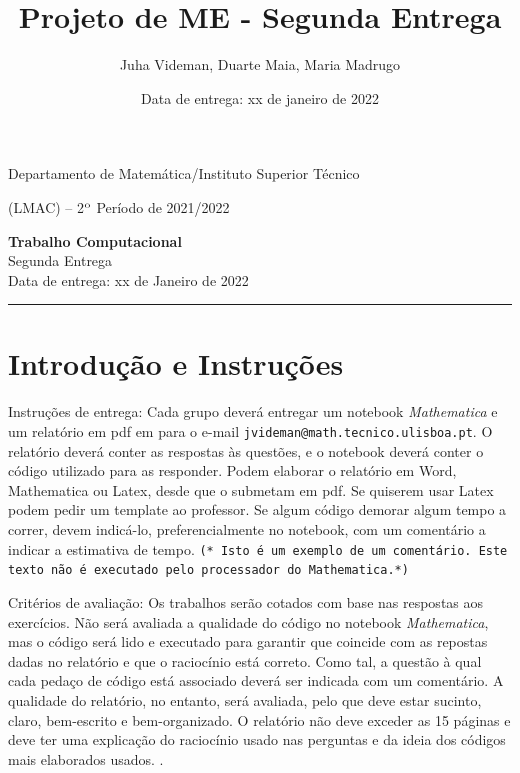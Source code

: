 \documentclass{article}
\title{Projeto de ME - Segunda Entrega}
\author{Juha Videman, Duarte Maia, Maria Madrugo}
\date{Data de entrega: xx de janeiro de 2022}
\begin{document}

\noindent Departamento de  Matemática/Instituto Superior
Técnico \vspace{3mm}

 ({\small LMAC}) -- 2$^{\rm o}$ Período de 2021/2022

\bigskip

\begin{center}
{\bf\Large   Trabalho Computacional}\\ 
\smallskip
{\large Segunda Entrega}\\
Data de entrega: xx de Janeiro de 2022
\end{center}

\bigskip
\hrule

\section*{Introdução e Instruções}

Instruções de entrega: Cada grupo deverá entregar um notebook \textit{Mathematica} e um relatório em pdf em para o e-mail \texttt{jvideman@math.tecnico.ulisboa.pt}. O relatório deverá conter as respostas às questões, e o notebook deverá conter o código utilizado para as responder. Podem elaborar o relatório em Word, Mathematica ou Latex, desde que o submetam em pdf. Se quiserem usar Latex podem pedir um template ao professor. Se algum código demorar algum tempo a correr, devem indicá-lo, preferencialmente no notebook,  com um comentário a indicar a estimativa de tempo. \texttt{(* Isto é um exemplo de um comentário. Este texto não é executado pelo processador do Mathematica.*)}

\smallskip

Critérios de avaliação: Os trabalhos serão cotados com base nas respostas aos exercícios. Não será avaliada a qualidade do código no notebook \textit{Mathematica}, mas o código será lido e executado para garantir que coincide com as repostas dadas no relatório e que o raciocínio está correto. Como tal, a questão à qual cada pedaço de código está associado deverá ser indicada com um comentário. A qualidade do relatório, no entanto, será avaliada, pelo que deve estar sucinto, claro, bem-escrito e bem-organizado. O relatório não deve exceder as 15 páginas \color{purple} e deve ter uma explicação do raciocínio usado nas perguntas e da ideia dos códigos mais elaborados usados. \color{black}. 
\end{document}
